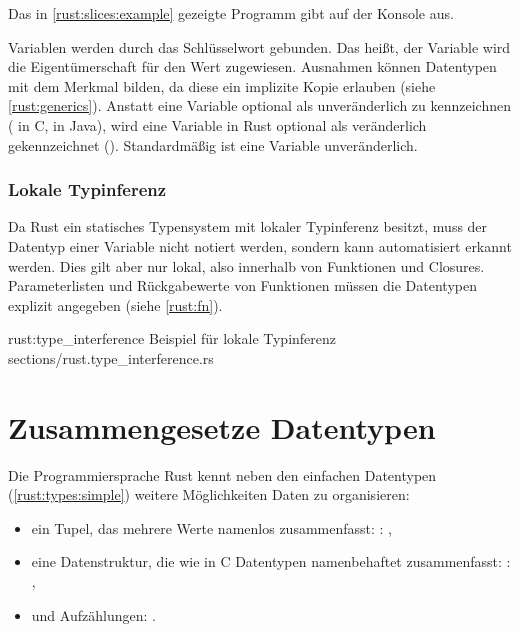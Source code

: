 Das in \autoref{rust:slices:example} gezeigte Programm gibt auf der Konsole  aus.

Variablen werden durch das  Schlüsselwort gebunden. Das heißt, der Variable wird die Eigentümerschaft für den Wert zugewiesen.
Ausnahmen können Datentypen mit dem Merkmal  bilden, da diese ein implizite Kopie erlauben (siehe \autoref{rust:generics}).
Anstatt eine Variable optional als unveränderlich zu kennzeichnen ( in C,  in Java), wird eine Variable in Rust optional als veränderlich gekennzeichnet (). Standardmäßig ist eine Variable unveränderlich.

\subsubsection{Lokale Typinferenz}

Da Rust ein statisches Typensystem mit lokaler Typinferenz besitzt, muss der Datentyp einer Variable nicht notiert werden, sondern kann automatisiert erkannt werden.
Dies gilt aber nur lokal, also innerhalb von Funktionen und Closures.
Parameterlisten und Rückgabewerte von Funktionen müssen die Datentypen explizit angegeben (siehe \autoref{rust:fn}).

\rustcinclude
	{rust:type_interference}
	{Beispiel für lokale Typinferenz}
	{sections/rust.type_interference.rs}
	



\section{Zusammengesetze Datentypen}
\label{rust:types:composed}

Die Programmiersprache Rust kennt neben den einfachen Datentypen (\autoref{rust:types:simple}) weitere Möglichkeiten Daten zu organisieren:
\begin{itemize}
	\item ein Tupel, das mehrere Werte namenlos zusammenfasst: : ,
	\item eine Datenstruktur, die wie in C Datentypen namenbehaftet zusammenfasst: \linebreak{}: ,
	\item und Aufzählungen: .
\end{itemize}

